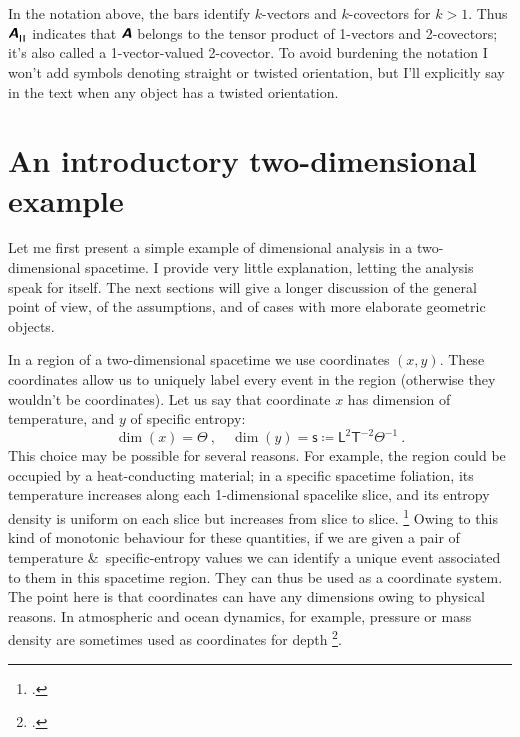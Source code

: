 \documentclass[\ifafour a4paper,12pt,\else a5paper,10pt,\fi%
onecolumn,oneside,article,%
british%
]{memoir}
\makeatletter
\theoremstyle{remark}
\theoremstyle{innote}
\newcommand*{\mathte}[1]{\textbf{\textit{\textsf{#1}}}}
\newcommand*{\citep}{\footcites}
\newcommand*{\amp}{\&}
\newcommand*{\defd}{\coloneqq}
\renewcommand*{\|}[1][]{\nonscript\,#1\vert\nonscript\;\mathopen{}}
\newcommand*{\sect}{\S}%
\newcommand*{\chap}{ch.}%
\newcommand*{\eg}{{e.g.}}
\newcommand*{\q}{}%
\DeclareRobustCommand*{\q}{%
  \mathbin{\mathpalette\bigcdot@{}}%
}
\newcommand*{\bigcdot@scalefactor}{0.7}
\newcommand*{\bigcdot@widthfactor}{1.5}
\newcommand*{\bigcdot@}[2]{%
  \sbox0{$#1\vcenter{}$}%
  \sbox2{$#1\cdot\m@th$}%
  \hbox to \bigcdot@widthfactor\wd2{%
    \hfil
    \raise\ht0\hbox{%
      \scalebox{\bigcdot@scalefactor}{%
        \lower\ht0\hbox{$#1\bullet\m@th$}%
      }%
    }%
    \hfil
  }%
}
\newcommand*{\Le}{\textsf{L}}
\newcommand*{\Ti}{\textsf{T}}
\newcommand*{\Te}{\Theta}
\newcommand*{\Ent}{\textsf{s}}
\newcommand*{\yA}{\mathte{A}}
\renewcommand*{\i}{\indices}
\newcommand*{\rul}{{\mkern2mu\rule[-0.1ex]{0.75pt}{1.1ex}\mkern2mu}}
\DeclarePairedDelimiter\mul{\rul}{\rul}%
\makeatother
\begin{document}
In the notation above, the bars identify $k$-vectors and $k$-covectors for
$k>1$. Thus $\yA\i{^{\q}_{\mul{\q\q}}}$ indicates that $\yA$ belongs to the
tensor product of 1-vectors and 2-covectors; it's also called a
1-vector-valued 2-covector. To avoid burdening the notation I won't add
symbols denoting straight or twisted orientation, but I'll explicitly say
in the text when any object has a twisted orientation.










\section{An introductory two-dimensional example}
\label{sec:2d_example}

Let me first present a simple example of dimensional analysis in a
two-dimensional spacetime. I provide very little explanation, letting the
analysis speak for itself. The next sections will give a longer discussion
of the general point of view, of the assumptions, and of cases with more
elaborate geometric objects.

In a region of a two-dimensional spacetime we use coordinates $(x,y)$.
These coordinates allow us to uniquely label every event in the region
(otherwise they wouldn't be coordinates). Let us say that coordinate $x$
has dimension of temperature, and $y$ of specific entropy:
\begin{equation}
  \label{eq:example_coords2d}
  \dim(x)=\Te \ ,\quad
  \dim(y)= \Ent \defd \Le^{2}\Ti^{-2}\Te^{-1} \ .
\end{equation}
This choice may be possible for several reasons. For example, the region
could be occupied by a heat-conducting material; in a specific spacetime
foliation, its temperature increases along each 1-dimensional spacelike
slice, and its entropy density is uniform on each slice but increases from
slice to slice. \citep[For general-relativistic thermomechanics see
\eg][]{eckart1940c,maugin1974b,maugin1978b,maugin1978c,maugin1978d,maugin1978e,muschiketal2014}
Owing to this kind of monotonic behaviour for these quantities, if we are
given a pair of temperature \amp\ specific-entropy values we can identify a
unique event associated to them in this spacetime region. They can thus be
used as a coordinate system. The point here is that coordinates can have
any dimensions owing to physical reasons. In atmospheric and ocean
dynamics, for example, pressure or mass density are sometimes used as
coordinates for depth
\citep[\chap~6]{griffies2004}[\sect~2.6.2]{vallis2006}.
\end{document}
